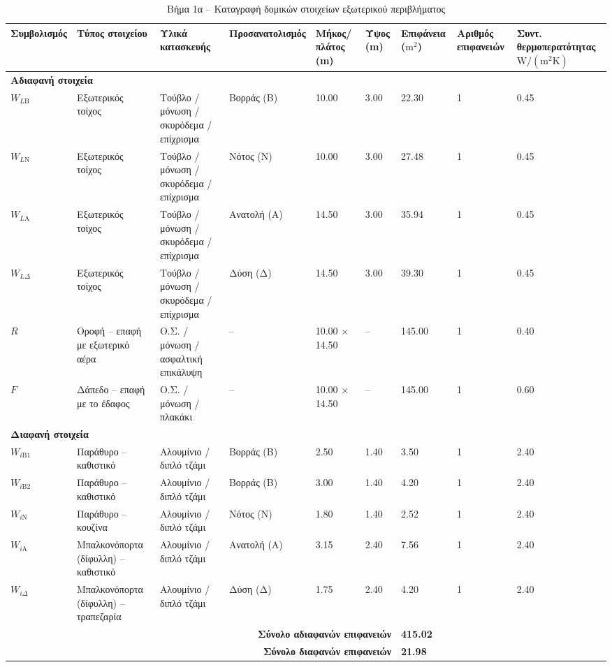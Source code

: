 \documentclass[12pt,a4paper]{article}
\begin{document}
\setcounter{table}{5}
\begin{landscape}
\begin{table}[H]
\centering
\renewcommand{\arraystretch}{1.3}
\footnotesize
\caption{Βήμα 1α -- Καταγραφή δομικών στοιχείων εξωτερικού περιβλήματος}
\begin{tabular}{p{1.9cm}p{3.0cm}p{4.0cm}p{2.3cm}p{2.2cm}p{1.5cm}p{1.8cm}p{1.7cm}p{2.0cm}}
\toprule
\textbf{Συμβο\-λι\-σμός} & \textbf{Τύπος στοιχείου} & \textbf{Υλικά κατα\-σκευής} & \textbf{Προσανα\-τολι\-σμός} & \textbf{Μήκος/ πλάτος (m)} & \textbf{Ύψος (m)} & \textbf{Επι\-φάνεια (\(\mathrm{m^2}\))} & \textbf{Αριθμός επι\-φα\-νειών} & \textbf{Συντ. θερμο\-περα\-τότητας \(\mathrm{W/(m^2K)}\)} \\
\midrule
\multicolumn{9}{l}{\textbf{Αδιαφανή στοιχεία}} \\
\midrule
\(W_{L\mathrm{B}}\) & Εξωτερικός τοίχος & Τούβλο / μόνωση / σκυρόδεμα / επίχρισμα & Βορράς (Β) & 10.00 & 3.00 & 22.30 & 1 & 0.45 \\
\(W_{L\mathrm{N}}\) & Εξωτερικός τοίχος & Τούβλο / μόνωση / σκυρόδεμα / επίχρισμα & Νότος (Ν) & 10.00 & 3.00 & 27.48 & 1 & 0.45 \\
\(W_{L\mathrm{A}}\) & Εξωτερικός τοίχος & Τούβλο / μόνωση / σκυρόδεμα / επίχρισμα & Ανατολή (Α) & 14.50 & 3.00 & 35.94 & 1 & 0.45 \\
\(W_{L\Delta}\) & Εξωτερικός τοίχος & Τούβλο / μόνωση / σκυρόδεμα / επίχρισμα & Δύση (Δ) & 14.50 & 3.00 & 39.30 & 1 & 0.45 \\
\(R\) & Οροφή -- επαφή με εξωτερικό αέρα & Ο.Σ. / μόνωση / ασφαλτική επικάλυψη & -- & 10.00 \(\times\) 14.50 & -- & 145.00 & 1 & 0.40 \\
\(F\) & Δάπεδο -- επαφή με το έδαφος & Ο.Σ. / μόνωση / πλακάκι & -- & 10.00 \(\times\) 14.50 & -- & 145.00 & 1 & 0.60 \\
\midrule
\multicolumn{9}{l}{\textbf{Διαφανή στοιχεία}} \\
\midrule
\(W_{i\mathrm{B}1}\) & Παράθυρο -- καθιστικό & Αλουμίνιο / διπλό τζάμι & Βορράς (Β) & 2.50 & 1.40 & 3.50 & 1 & 2.40 \\
\(W_{i\mathrm{B}2}\) & Παράθυρο -- καθιστικό & Αλουμίνιο / διπλό τζάμι & Βορράς (Β) & 3.00 & 1.40 & 4.20 & 1 & 2.40 \\
\(W_{i\mathrm{N}}\) & Παράθυρο -- κουζίνα & Αλουμίνιο / διπλό τζάμι & Νότος (Ν) & 1.80 & 1.40 & 2.52 & 1 & 2.40 \\
\(W_{i\mathrm{A}}\) & Μπαλκονόπορτα (δίφυλλη) -- καθιστικό & Αλουμίνιο / διπλό τζάμι & Ανατολή (Α) & 3.15 & 2.40 & 7.56 & 1 & 2.40 \\
\(W_{i\Delta}\) & Μπαλκονόπορτα (δίφυλλη) -- τραπεζαρία & Αλουμίνιο / διπλό τζάμι & Δύση (Δ) & 1.75 & 2.40 & 4.20 & 1 & 2.40 \\
\midrule
\multicolumn{6}{r}{\textbf{Σύνολο αδιαφανών επιφανειών}} & \textbf{415.02} & \multicolumn{2}{l}{} \\
\multicolumn{6}{r}{\textbf{Σύνολο διαφανών επιφανειών}} & \textbf{21.98} & \multicolumn{2}{l}{} \\
\bottomrule
\end{tabular}
\end{table}
\end{landscape}
\end{document}
